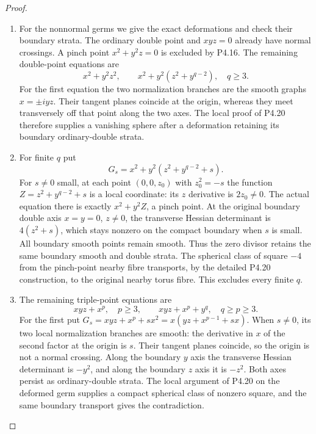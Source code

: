 \begin{proof}
\begin{enumerate}[label={$\langle1\rangle$\arabic*.},leftmargin=*]
\item For the nonnormal germs we give the exact
deformations and check their boundary strata.
The ordinary double point and $xyz=0$
already have normal crossings. A pinch point
$x^2+y^2z=0$ is excluded by P4.16.
The remaining double-point equations are
\[
 x^2+y^2z^2,\qquad
 x^2+y^2(z^2+y^{q-2}),\quad q\ge3.
\]
For the first equation the two normalization
branches are the smooth graphs $x=\pm i yz$.
Their tangent planes coincide at the origin,
whereas they meet transversely off that point
along the two axes. The local proof of P4.20
therefore supplies a vanishing sphere after
a deformation retaining its boundary
ordinary-double strata.

\item For finite $q$ put
\[
 G_s=x^2+y^2(z^2+y^{q-2}+s).
\]
For $s\ne0$ small, at each point
$(0,0,z_0)$ with $z_0^2=-s$ the function
$Z=z^2+y^{q-2}+s$ is a local coordinate:
its $z$ derivative is $2z_0\ne0$.
The actual equation there is exactly
$x^2+y^2Z$, a pinch point. At the original
boundary double axis $x=y=0$, $z\ne0$,
the transverse Hessian determinant is
$4(z^2+s)$, which stays nonzero on the
compact boundary when $s$ is small.
All boundary smooth points remain smooth.
Thus the zero divisor retains the same
boundary smooth and double strata.
The spherical class of square $-4$
from the pinch-point nearby fibre transports,
by the detailed P4.20 construction, to
the original nearby torus fibre.
This excludes every finite $q$.

\item The remaining triple-point equations are
\[
 xyz+x^p,\quad p\ge3,\qquad
 xyz+x^p+y^q,\quad q\ge p\ge3.
\]
For the first put
$G_s=xyz+x^p+s x^2
=x(yz+x^{p-1}+s x)$.
When $s\ne0$, its two local normalization
branches are smooth: the derivative in $x$
of the second factor at the origin is $s$.
Their tangent planes coincide, so the
origin is not a normal crossing. Along
the boundary $y$ axis the transverse
Hessian determinant is $-y^2$, and along
the boundary $z$ axis it is $-z^2$.
Both axes persist as ordinary-double
strata. The local argument of P4.20 on
the deformed germ supplies a compact
spherical class of nonzero square, and
the same boundary transport gives the
contradiction.


\end{enumerate}
\end{proof}
